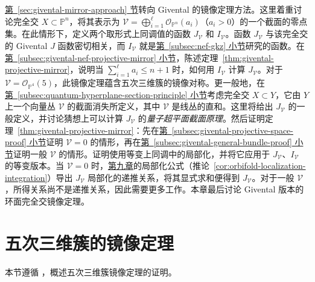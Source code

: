 \hyperref[sec:givental-mirror-approach]{第~\ref*{sec:givental-mirror-approach} 节}转向 Givental 的镜像定理方法。这里着重讨论完全交 $X\subset\mathbb P^n$，将其表示为 $\mathcal V=\bigoplus_{i=1}^{\ell}\mathcal O_{\mathbb P^n}(a_i)$（$a_i>0$）的一个截面的零点集。在此情形下，定义两个取形式上同调值的函数 $J_{\mathcal V}$ 和 $I_{\mathcal V}$。函数 $J_{\mathcal V}$ 与该完全交的 Givental $J$ 函数密切相关，而 $I_{\mathcal V}$
就是\hyperref[subsec:nef-gkz]{第~\ref*{subsec:nef-gkz} 小节}研究的函数。在\hyperref[subsec:givental-nef-projective-mirror]{第~\ref*{subsec:givental-nef-projective-mirror} 小节}，陈述定理~\ref{thm:givental-projective-mirror}，说明当 $\sum_{i=1}^{\ell}a_i\le n+1$ 时，如何用 $I_{\mathcal V}$ 计算 $J_{\mathcal V}$。对于 $\mathcal V=\mathcal O_{\mathbb P^4}(5)$，此镜像定理蕴含五次三维簇的镜像对称。更一般地，在\hyperref[subsec:quantum-hyperplane-section-principle]{第~\ref*{subsec:quantum-hyperplane-section-principle} 小节}考虑完全交 $X\subset Y$，它由 $Y$ 上一个向量丛 $\mathcal V$ 的截面消失所定义，其中 $\mathcal V$ 是线丛的直和。这里将给出 $J_{\mathcal V}$ 的一般定义，并讨论猜想上可以计算 $J_{\mathcal V}$ 的\emph{量子超平面截面原理}。然后证明定理~\ref{thm:givental-projective-mirror}：先在\hyperref[subsec:givental-projective-space-proof]{第~\ref*{subsec:givental-projective-space-proof} 小节}证明 $\mathcal V=0$ 的情形，再在\hyperref[subsec:givental-general-bundle-proof]{第~\ref*{subsec:givental-general-bundle-proof} 小节}证明一般 $\mathcal V$ 的情形。证明使用等变上同调中的局部化，并将它应用于 $J_{\mathcal V}$、$I_{\mathcal V}$ 的等变版本。当 $\mathcal V=0$ 时，\hyperref[chap:localization]{第九章}的局部化公式（推论~\ref{cor:orbifold-localization-integration}）导出 $J_{\mathcal V}$ 局部化的递推关系，将其显式求和便得到 $J_{\mathcal V}$。对于一般 $\mathcal V$，所得关系尚不是递推关系，因此需要更多工作。本章最后讨论 Givental 版本的环面完全交镜像定理。

\section{五次三维簇的镜像定理}\label{sec:quintic-mirror-theorem}
本节遵循 ，概述五次三维簇镜像定理的证明。
